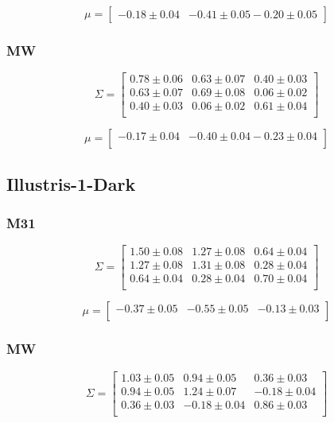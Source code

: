 \documentclass[a4paper,fleqn,usenatbib]{mnras}
\begin{document}
\[
\mu= 
\begin{bmatrix}
-0.18\pm 0.04 & -0.41\pm 0.05  -0.20\pm 0.05
\end{bmatrix}
\]

\subsubsection{MW}

\[
\Sigma= 
\begin{bmatrix}
 0.78\pm 0.06 & 0.63 \pm 0.07  & 0.40 \pm 0.03\\
  0.63\pm 0.07 & 0.69 \pm 0.08 &  0.06 \pm 0.02\\
  0.40\pm 0.03 & 0.06 \pm 0.02 &  0.61\pm 0.04\\
\end{bmatrix}
\]

\[
\mu= 
\begin{bmatrix}
-0.17\pm 0.04 & -0.40\pm 0.04 -0.23\pm 0.04\\
\end{bmatrix}
\]

\subsection{Illustris-1-Dark}

\subsubsection{M31}

\[
\Sigma= 
\begin{bmatrix}
 1.50\pm 0.08 & 1.27\pm 0.08 & 0.64\pm 0.04\\
  1.27\pm 0.08 &  1.31\pm 0.08&  0.28\pm 0.04\\
  0.64\pm 0.04 &  0.28\pm 0.04 & 0.70\pm 0.04\\
\end{bmatrix}
\]

\[
\mu= 
\begin{bmatrix}
-0.37\pm 0.05& -0.55\pm 0.05 & -0.13\pm 0.03\\
\end{bmatrix}
\]

\subsubsection{MW}

\[
\Sigma= 
\begin{bmatrix}
 1.03\pm 0.05 & 0.94\pm 0.05  & 0.36\pm 0.03\\
  0.94\pm 0.05 & 1.24\pm 0.07 & -0.18\pm 0.04\\
  0.36\pm 0.03 & -0.18\pm 0.04  & 0.86\pm 0.03\\
\end{bmatrix}
\]
\end{document}
